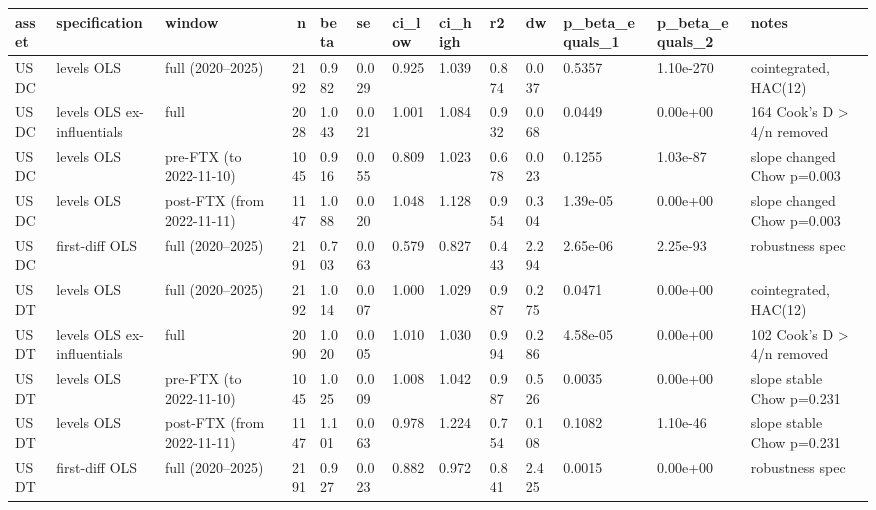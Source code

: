 \begin{tabular}{lllrlllllllll}
\toprule
asset & specification & window & n & beta & se & ci_low & ci_high & r2 & dw & p_beta_equals_1 & p_beta_equals_2 & notes \\
\midrule
USDC & levels OLS & full (2020–2025) & 2192 & 0.982 & 0.029 & 0.925 & 1.039 & 0.874 & 0.037 & 0.5357 & 1.10e-270 & cointegrated, HAC(12) \\
USDC & levels OLS ex-influentials & full & 2028 & 1.043 & 0.021 & 1.001 & 1.084 & 0.932 & 0.068 & 0.0449 & 0.00e+00 & 164 Cook's D > 4/n removed \\
USDC & levels OLS & pre-FTX (to 2022-11-10) & 1045 & 0.916 & 0.055 & 0.809 & 1.023 & 0.678 & 0.023 & 0.1255 & 1.03e-87 & slope changed Chow p=0.003 \\
USDC & levels OLS & post-FTX (from 2022-11-11) & 1147 & 1.088 & 0.020 & 1.048 & 1.128 & 0.954 & 0.304 & 1.39e-05 & 0.00e+00 & slope changed Chow p=0.003 \\
USDC & first-diff OLS & full (2020–2025) & 2191 & 0.703 & 0.063 & 0.579 & 0.827 & 0.443 & 2.294 & 2.65e-06 & 2.25e-93 & robustness spec \\
USDT & levels OLS & full (2020–2025) & 2192 & 1.014 & 0.007 & 1.000 & 1.029 & 0.987 & 0.275 & 0.0471 & 0.00e+00 & cointegrated, HAC(12) \\
USDT & levels OLS ex-influentials & full & 2090 & 1.020 & 0.005 & 1.010 & 1.030 & 0.994 & 0.286 & 4.58e-05 & 0.00e+00 & 102 Cook's D > 4/n removed \\
USDT & levels OLS & pre-FTX (to 2022-11-10) & 1045 & 1.025 & 0.009 & 1.008 & 1.042 & 0.987 & 0.526 & 0.0035 & 0.00e+00 & slope stable Chow p=0.231 \\
USDT & levels OLS & post-FTX (from 2022-11-11) & 1147 & 1.101 & 0.063 & 0.978 & 1.224 & 0.754 & 0.108 & 0.1082 & 1.10e-46 & slope stable Chow p=0.231 \\
USDT & first-diff OLS & full (2020–2025) & 2191 & 0.927 & 0.023 & 0.882 & 0.972 & 0.841 & 2.425 & 0.0015 & 0.00e+00 & robustness spec \\
\bottomrule
\end{tabular}
